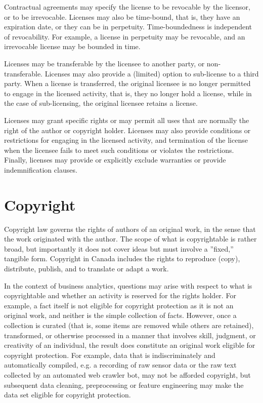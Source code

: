 Contractual agreements may specify the license to be revocable by the licensor, or to be irrevocable. Licenses may also be time-bound, that is, they have an expiration date, or they can be in perpetuity. Time-boundedness is independent of revocability. For example, a license in perpetuity may be revocable, and an irrevocable license may be bounded in time. 

Licenses may be transferable by the licensee to another party, or non-transferable. Licenses may also provide a (limited) option to sub-license to a third party. When a license is transferred, the original licensee is no longer permitted to engage in the licensed activity, that is, they no longer hold a license, while in the case of sub-licensing, the original licensee retains a license. 

Licenses may grant specific rights or may permit all uses that are normally the right of the author or copyright holder. Licenses may also provide conditions or restrictions for engaging in the licensed activity, and termination of the license when the licensee fails to meet such conditions or violates the restrictions. Finally, licenses may provide or explicitly exclude warranties or provide indemnification clauses.

\section{Copyright}

Copyright law governs the rights of authors of an original work, in the sense that the work originated with the author. The scope of what is copyrightable is rather broad, but importantly it does not cover ideas but must involve a ''fixed,'' tangible form. Copyright in Canada includes the rights to reproduce (copy), distribute, publish, and to translate or adapt a work. 

In the context of business analytics, questions may arise with respect to what is copyrightable and whether an activity is reserved for the rights holder. For example, a fact itself is not eligible for copyright protection as it is not an original work, and neither is the simple collection of facts. However, once a collection is curated (that is, some items are removed while others are retained), transformed, or otherwise processed in a manner that involves skill, judgment, or creativity of an individual, the result does constitute an original work eligible for copyright protection. For example, data that is indiscriminately and automatically compiled, e.g. a recording of raw sensor data or the raw text collected by an automated web crawler bot, may not be afforded copyright, but subsequent data cleaning, preprocessing or feature engineering may make the data set eligible for copyright protection.

